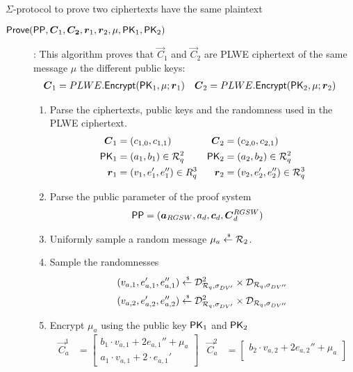 \begin{section}{$\Sigma$-protocol to prove two ciphertexts have the same plaintext}
\begin{description}
      \item [$\Prove(\PPP, \vec{C}_1, \vec{C_2}, \vec{r}_1, \vec{r}_2, \mu, \PK_1, \PK_2)$]:
      This algorithm proves that $\vec{C}_1$ and $\vec{C}_2$ are PLWE ciphertext of the same message $\mu$
      \wrt the different public keys:
      \begin{align*}
        \vec{C}_1 &= PLWE.\Enc(\PK_1, \mu; \vec{r}_1) &  \vec{C}_2 &= PLWE.\Enc(\PK_2, \mu; \vec{r}_2)
      \end{align*}
      \begin{enumerate}
        \item Parse the ciphertexts, public keys and the randomness used in the PLWE ciphertext.
        \begin{align*}
          \vec{C}_1 &= (c_{1,0}, c_{1,1}) & \vec{C}_2 &= (c_{2,0}, c_{2,1})\\
          \PK_1 &= (a_1, b_1) \in \R_q^2 & \PK_2 &= (a_2, b_2) \in \R_q^2 \\
          \vec{r}_1 &= (v_1, e_1', e_1'') \in R_q^3 & \vec{r}_2 &= (v_2, e_2', e_2'') \in \R_q^3
        \end{align*}
        \item Parse the public parameter of the proof system
        \begin{align*}
          \PPP &= (\vec{a}_{RGSW}, a_d, \vec{c}_d, \vec{C}_{d}^{RGSW})
        \end{align*}
        \item Uniformly sample a random message $\mu_a \stackrel{{\scriptscriptstyle \mkern4mu \$}}{\gets} {\mathcal{R}}_2$.
        \item Sample the randomnesses
        \begin{align*}
          (v_{a,1}, e_{a,1}', e_{a,1}'') &\stackrel{{\scriptscriptstyle \mkern4mu \$}}{\gets} \mathcal{D}^2_{{\mathcal{R}}_q, \sigma_{DV'}} \times \mathcal{D}_{{\mathcal{R}}_q, \sigma_{DV''}}\\
          (v_{a,2}, e_{a,2}', e_{a,2}'') &\stackrel{{\scriptscriptstyle \mkern4mu \$}}{\gets} \mathcal{D}_{{\mathcal{R}}_q, \sigma_{DV'}}^2 \times \mathcal{D}_{{\mathcal{R}}_q, \sigma_{DV''}}
        \end{align*}
        \item Encrypt $\mu_a$ using the public key $\mathsf{PK}_1$ and $\mathsf{PK}_2$
        \begin{align*}
          \vec{C}_{a}^{1} &=
          \begin{bmatrix} b_1 \cdot v_{a,1} + 2 e_{a,1}''+ \mu_a  \\
            a_1 \cdot v_{a,1} + 2 \cdot e_{a,1}' \end{bmatrix} &
            \vec{C}_{a}^{2} &= \begin{bmatrix} b_2 \cdot v_{a,2} + 2 e_{a,2}''+ \mu_a \\

\end{bmatrix}
\end{align*}
\end{enumerate}
\end{description}
\end{section}
